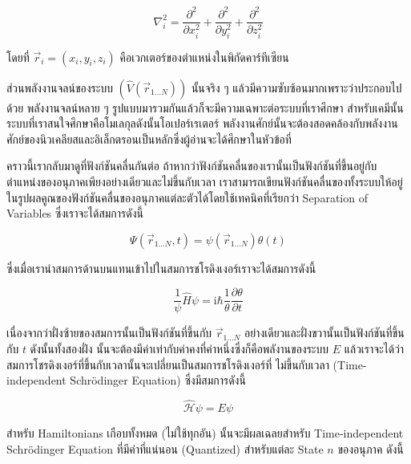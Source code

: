 \begin{equation}
    \label{eq:nabla}
    \nabla_i^2
    =
    \frac{\partial^2}{\partial x_i^2}
    + \frac{\partial^2}{\partial y_i^2}
    + \frac{\partial^2}{\partial z_i^2}
\end{equation}

\noindent โดยที่ $\vec{r}_i = \left(x_i, y_i, z_i\right)$ คือเวกเตอร์ของตำแหน่งในพิกัดคาร์ทีเซียน

ส่วนพลังงานจลน์ของระบบ $(\hat{V}\left(\vec{r}_{1 \ldots N}\right))$ นั้นจริง ๆ แล้วมีความซับซ้อนมากเพราะว่าประกอบไปด้วย%
พลังงานจลน์หลาย ๆ รูปแบบมารวมกันแล้วก็จะมีความเฉพาะต่อระบบที่เราศึกษา สำหรับเคมีนั้นระบบที่เราสนใจศึกษาคือโมเลกุลดังนั้นโอเปอร์เรเตอร์%
พลังงานศักย์นั้นจะต้องสอดคล้องกับพลังงานศักย์ของนิวเคลียสและอิเล็กตรอนเป็นหลักซึ่งผู้อ่านจะได้ศึกษาในหัวข้อที่

คราวนี้เรากลับมาดูที่ฟังก์ชันคลื่นกันต่อ ถ้าหากว่าฟังก์ชันคลื่นของเรานั้นเป็นฟังก์ชันที่ขึ้นอยู่กับตำแหน่งของอนุภาคเพียงอย่างเดียวและไม่ขึ้นกับเวลา
เราสามารถเขียนฟังก์ชันคลื่นของทั้งระบบให้อยู่ในรูปผลคูณของฟังก์ชันคลื่นของอนุภาคแต่ละตัวได้โดยใช้เทคนิคที่เรียกว่า Separation of Variables
ซึ่งเราจะได้สมการดังนี้

\begin{equation}
    \Psi\left(\vec{r}_{1 \ldots N}, t\right)
    =
    \psi\left(\vec{r}_{1 \ldots N}\right) \theta(t)
\end{equation}

\noindent ซึ่งเมื่อเรานำสมการด้านบนแทนเข้าไปในสมการชโรดิงเงอร์เราจะได้สมการดังนี้

\begin{equation}
    \frac{1}{\psi} \hat{H} \psi
    =
    \mathrm{i} \hbar
    \frac{1}{\theta}
    \frac{\partial \theta}{\partial t}
\end{equation}

เนื่องจากว่าฝั่งซ้ายของสมการนั้นเป็นฟังก์ชันที่ขึ้นกับ $\vec{r}_{1 . . . N}$ อย่างเดียวและฝั่งขวานั้นเป็นฟังก์ชันที่ขึ้นกับ $t$ ดังนั้นทั้งสองฝั่ง%
นั้นจะต้องมีค่าเท่ากับค่าคงที่ค่าหนึ่งซึ่งก็คือพลังานของระบบ $E$ แล้วเราจะได้ว่าสมการโชรดิงเงอร์ที่ขึ้นกับเวลานั้นจะเปลี่ยนเป็นสมการชโรดิงเงอร์ที่%
ไม่ขึ้นกับเวลา (Time-independent Schr\"{o}dinger Equation) ซึ่งมีสมการดังนี้

\begin{equation}
    \label{eq:time_independent_schrodinger}
    \hat{\mathscr{H}} \psi = E \psi
\end{equation}

สำหรับ Hamiltonians เกือบทั้งหมด (ไม่ใช้ทุกอัน) นั้นจะมีผลเฉลยสำหรับ Time-independent Schr\"{o}dinger Equation ที่มีค่าที่แน่นอน
(Quantized) สำหรับแต่ละ State $n$ ของอนุภาค ดังนี้

